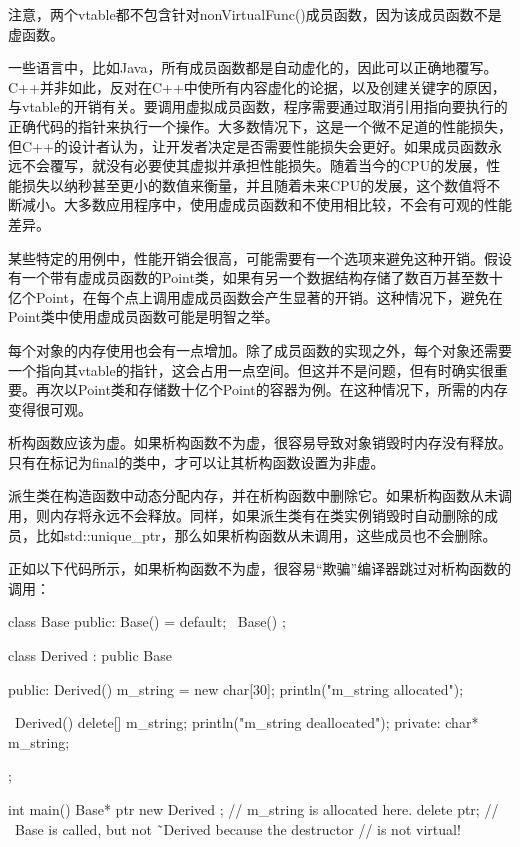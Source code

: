 注意，两个vtable都不包含针对nonVirtualFunc()成员函数，因为该成员函数不是虚函数。


一些语言中，比如Java，所有成员函数都是自动虚化的，因此可以正确地覆写。C++并非如此，反对在C++中使所有内容虚化的论据，以及创建关键字的原因，与vtable的开销有关。要调用虚拟成员函数，程序需要通过取消引用指向要执行的正确代码的指针来执行一个操作。大多数情况下，这是一个微不足道的性能损失，但C++的设计者认为，让开发者决定是否需要性能损失会更好。如果成员函数永远不会覆写，就没有必要使其虚拟并承担性能损失。随着当今的CPU的发展，性能损失以纳秒甚至更小的数值来衡量，并且随着未来CPU的发展，这个数值将不断减小。大多数应用程序中，使用虚成员函数和不使用相比较，不会有可观的性能差异。

某些特定的用例中，性能开销会很高，可能需要有一个选项来避免这种开销。假设有一个带有虚成员函数的Point类，如果有另一个数据结构存储了数百万甚至数十亿个Point，在每个点上调用虚成员函数会产生显著的开销。这种情况下，避免在Point类中使用虚成员函数可能是明智之举。

每个对象的内存使用也会有一点增加。除了成员函数的实现之外，每个对象还需要一个指向其vtable的指针，这会占用一点空间。但这并不是问题，但有时确实很重要。再次以Point类和存储数十亿个Point的容器为例。在这种情况下，所需的内存变得很可观。


析构函数应该为虚。如果析构函数不为虚，很容易导致对象销毁时内存没有释放。只有在标记为final的类中，才可以让其析构函数设置为非虚。

派生类在构造函数中动态分配内存，并在析构函数中删除它。如果析构函数从未调用，则内存将永远不会释放。同样，如果派生类有在类实例销毁时自动删除的成员，比如std::unique\_ptr，那么如果析构函数从未调用，这些成员也不会删除。

正如以下代码所示，如果析构函数不为虚，很容易“欺骗”编译器跳过对析构函数的调用：

\begin{cpp}
class Base
{
    public:
        Base() = default;
        ~Base() {}
};

class Derived : public Base
{
    public:
        Derived()
        {
            m_string = new char[30];
            println("m_string allocated");
        }

        ~Derived()
        {
            delete[] m_string;
            println("m_string deallocated");
        }
    private:
        char* m_string;
};

int main()
{
    Base* ptr { new Derived {} }; // m_string is allocated here.
    delete ptr; // ~Base is called, but not ˜Derived because the destructor
                // is not virtual!
}
\end{cpp}

